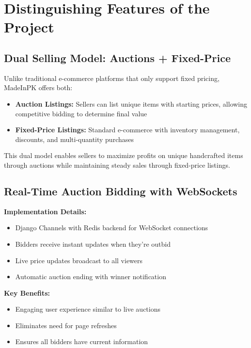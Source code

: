 \documentclass[12pt,a4paper]{article}
\begin{document}
\newpage

\section{Distinguishing Features of the Project}

\subsection{Dual Selling Model: Auctions + Fixed-Price}
Unlike traditional e-commerce platforms that only support fixed pricing, MadeInPK offers both:
\begin{itemize}
    \item \textbf{Auction Listings:} Sellers can list unique items with starting prices, allowing competitive bidding to determine final value
    \item \textbf{Fixed-Price Listings:} Standard e-commerce with inventory management, discounts, and multi-quantity purchases
\end{itemize}

This dual model enables sellers to maximize profits on unique handcrafted items through auctions while maintaining steady sales through fixed-price listings.

\subsection{Real-Time Auction Bidding with WebSockets}
\textbf{Implementation Details:}
\begin{itemize}
    \item Django Channels with Redis backend for WebSocket connections
    \item Bidders receive instant updates when they're outbid
    \item Live price updates broadcast to all viewers
    \item Automatic auction ending with winner notification
\end{itemize}

\textbf{Key Benefits:}
\begin{itemize}
    \item Engaging user experience similar to live auctions
    \item Eliminates need for page refreshes
    \item Ensures all bidders have current information
\end{itemize}
\end{document}
